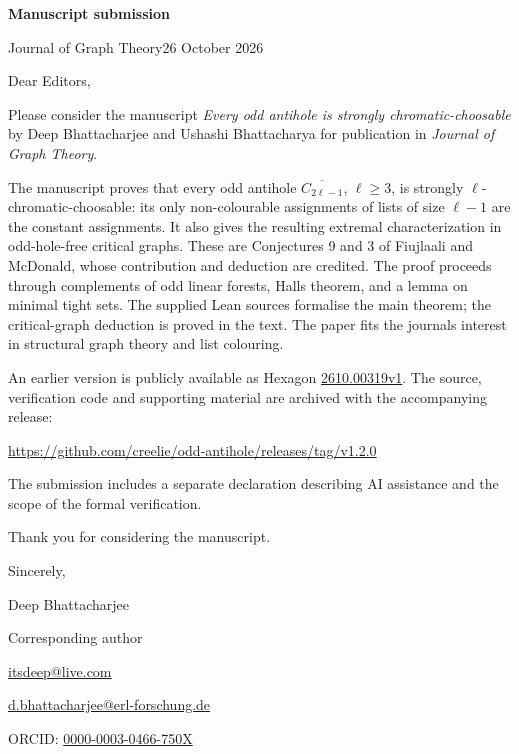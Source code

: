 \documentclass[11pt]{article}
\begin{document}
{\Large\bfseries Manuscript submission}\par
Journal of Graph Theory\hfill 26 October 2026

Dear Editors,

Please consider the manuscript \emph{Every odd antihole is strongly chromatic-choosable} by Deep Bhattacharjee and Ushashi Bhattacharya for publication in \emph{Journal of Graph Theory}.

The manuscript proves that every odd antihole $\overline{C_{2\ell-1}}$, $\ell\ge3$, is strongly $\ell$-chromatic-choosable: its only non-colourable assignments of lists of size $\ell-1$ are the constant assignments. It also gives the resulting extremal characterization in odd-hole-free critical graphs. These are Conjectures 9 and 3 of Fiujlaali and McDonald, whose contribution and deduction are credited. The proof proceeds through complements of odd linear forests, Hall\textquotesingle s theorem, and a lemma on minimal tight sets. The supplied Lean sources formalise the main theorem; the critical-graph deduction is proved in the text. The paper fits the journal\textquotesingle s interest in structural graph theory and list colouring.

An earlier version is publicly available as Hexagon \href{https://hexagonmath.org/2610.00319v1}{2610.00319v1}. The source, verification code and supporting material are archived with the accompanying release:
\begin{center}\url{https://github.com/creelie/odd-antihole/releases/tag/v1.2.0}\end{center}
The submission includes a separate declaration describing AI assistance and the scope of the formal verification.

Thank you for considering the manuscript.

Sincerely,\par
Deep Bhattacharjee\par
Corresponding author\par
\href{mailto:itsdeep@live.com}{itsdeep@live.com}\par
\href{mailto:d.bhattacharjee@erl-forschung.de}{d.bhattacharjee@erl-forschung.de}\par
ORCID: \href{https://orcid.org/0000-0003-0466-750X}{0000-0003-0466-750X}
\end{document}
